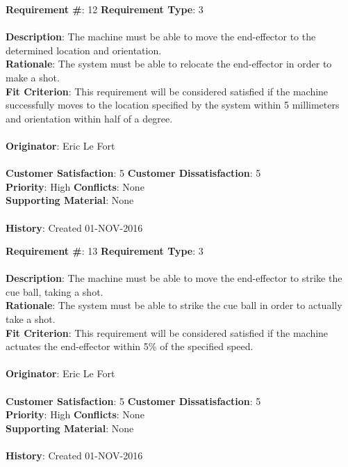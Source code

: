 \documentclass[titlepage]{article}
\begin{document}
\begin{framed}
	\noindent\textbf{Requirement \#}: 12 \hfill \textbf{Requirement Type}: 3 \hfill\\\\
	\noindent\textbf{Description}: The machine must be able to move the end-effector to the determined location and orientation.\\
	\textbf{Rationale}: The system must be able to relocate the end-effector in order to make a shot.\\
	\textbf{Fit Criterion}: This requirement will be considered satisfied if the machine successfully moves to the location specified by the system within 5 millimeters and orientation within half of a degree.\\\\
	\textbf{Originator}: Eric Le Fort\\\\
	\noindent\textbf{Customer Satisfaction}: 5 \hfill 	\textbf{Customer Dissatisfaction}: 5 \hfill\\
	\textbf{Priority}: High \hfill \textbf{Conflicts}: None \hfill\\
	\textbf{Supporting Material}: None\\\\
	\noindent\textbf{History}: Created 01-NOV-2016
\end{framed}

\begin{framed}
	\noindent\textbf{Requirement \#}: 13 \hfill \textbf{Requirement Type}: 3 \hfill\\\\
	\noindent\textbf{Description}: The machine must be able to move the end-effector to strike the cue ball, taking a shot.\\
	\textbf{Rationale}: The system must be able to strike the cue ball in order to actually take a shot.\\
	\textbf{Fit Criterion}: This requirement will be considered satisfied if the machine actuates the end-effector within 5\% of the specified speed.\\\\
	\textbf{Originator}: Eric Le Fort\\\\
	\noindent\textbf{Customer Satisfaction}: 5 \hfill 	\textbf{Customer Dissatisfaction}: 5 \hfill\\
	\textbf{Priority}: High \hfill \textbf{Conflicts}: None \hfill\\
	\textbf{Supporting Material}: None\\\\
	\noindent\textbf{History}: Created 01-NOV-2016
\end{framed}
\end{document}
